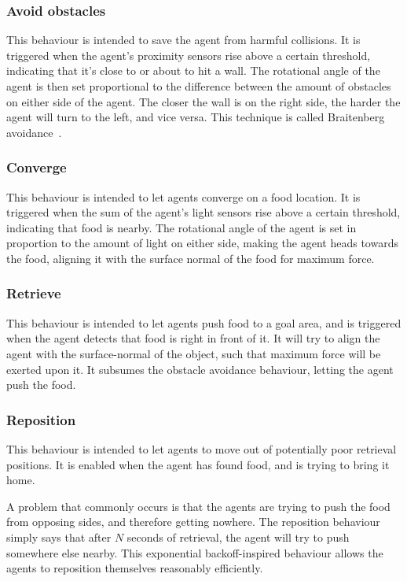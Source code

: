 \documentclass[a4paper]{article}
\begin{document}
\subsubsection{Avoid obstacles}
This behaviour is intended to save the agent from harmful collisions.
It is triggered when the agent's proximity sensors rise above a certain threshold, indicating that it's close to or about to hit a wall.
The rotational angle of the agent is then set proportional to the difference between the amount of obstacles on either side of the agent.
The closer the wall is on the right side, the harder the agent will turn to the left, and vice versa.
This technique is called Braitenberg avoidance~\cite{braitenberg}.

\subsubsection{Converge}
This behaviour is intended to let agents converge on a food location.
It is triggered when the sum of the agent's light sensors rise above a certain threshold, indicating that food is nearby.
The rotational angle of the agent is set in proportion to the amount of light on either side, making the agent heads towards the food, aligning it with the surface normal of the food for maximum force.

\subsubsection{Retrieve}
This behaviour is intended to let agents push food to a goal area, and is triggered when the agent detects that food is right in front of it.
It will try to align the agent with the surface-normal of the object, such that maximum force will be exerted upon it.
It subsumes the obstacle avoidance behaviour, letting the agent push the food.

\subsubsection{Reposition}
This behaviour is intended to let agents to move out of potentially poor retrieval positions.
It is enabled when the agent has found food, and is trying to bring it home.

A problem that commonly occurs is that the agents are trying to push the food from opposing sides, and therefore getting nowhere.
The reposition behaviour simply says that after $ N $ seconds of retrieval, the agent will try to push somewhere else nearby.
This exponential backoff-inspired behaviour allows the agents to reposition themselves reasonably efficiently.
\end{document}
